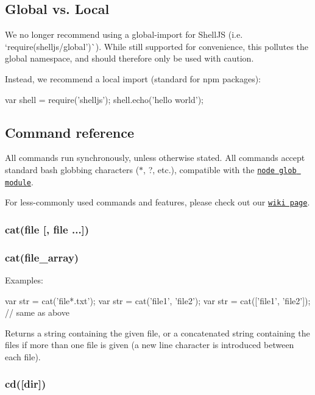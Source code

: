\subsection*{Global vs. Local}

We no longer recommend using a global-\/import for Shell\+JS (i.\+e. `require(\textquotesingle{}shelljs/global')\`{}). While still supported for convenience, this pollutes the global namespace, and should therefore only be used with caution.

Instead, we recommend a local import (standard for npm packages)\+:


\begin{DoxyCode}
var shell = require('shelljs');
shell.echo('hello world');
\end{DoxyCode}


\subsection*{Command reference}

All commands run synchronously, unless otherwise stated. All commands accept standard bash globbing characters ({\ttfamily $\ast$}, {\ttfamily ?}, etc.), compatible with the \href{https://github.com/isaacs/node-glob}{\tt node glob module}.

For less-\/commonly used commands and features, please check out our \href{https://github.com/shelljs/shelljs/wiki}{\tt wiki page}.

\subsubsection*{cat(file \mbox{[}, file ...\mbox{]})}

\subsubsection*{cat(file\+\_\+array)}

Examples\+:


\begin{DoxyCode}
var str = cat('file*.txt');
var str = cat('file1', 'file2');
var str = cat(['file1', 'file2']); // same as above
\end{DoxyCode}


Returns a string containing the given file, or a concatenated string containing the files if more than one file is given (a new line character is introduced between each file).

\subsubsection*{cd(\mbox{[}dir\mbox{]})}

